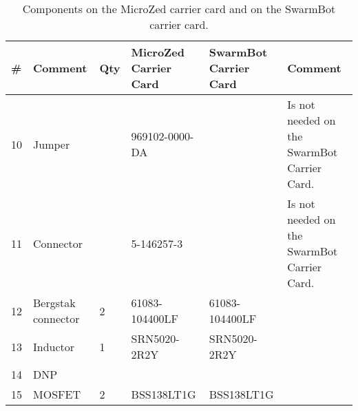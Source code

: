 \begin{sidewaystable}
\centering
\caption{Components on the MicroZed carrier card and on the SwarmBot carrier card.}
\label{tab:components2}
\begin{tabular}{|p{0.3cm}|p{2cm}|p{0.5cm}|l|l|p{5cm}|}
\hline
\textbf{\#}      & \textbf{Comment}       & \textbf{Qty} & \textbf{MicroZed Carrier Card} & \textbf{SwarmBot Carrier Card} & \textbf{Comment}                                                                                                                                                                                                      \\ \hline
10      & Jumper                 &          & 969102-0000-DA        &                       & Is not needed on the SwarmBot Carrier Card.                                                                                                                                                                  \\ \hline
11      & Connector              &          & 5-146257-3            &                       & Is not needed on the SwarmBot Carrier Card.                                                                                                                                                                  \\ \hline
12      & Bergstak connector     & 2        & 61083-104400LF        & 61083-104400LF        &                                                                                                                                                                                                              \\ \hline
13      & Inductor               & 1        & SRN5020-2R2Y          & SRN5020-2R2Y          &                                                                                                                                                                                                              \\ \hline
14      & DNP                    &          &                       &                       &                                                                                                                                                                                                              \\ \hline
15      & MOSFET                 & 2        & BSS138LT1G            & BSS138LT1G            &                                                                                                                                                                                                              \\ \hline

\end{tabular}
\end{sidewaystable}
